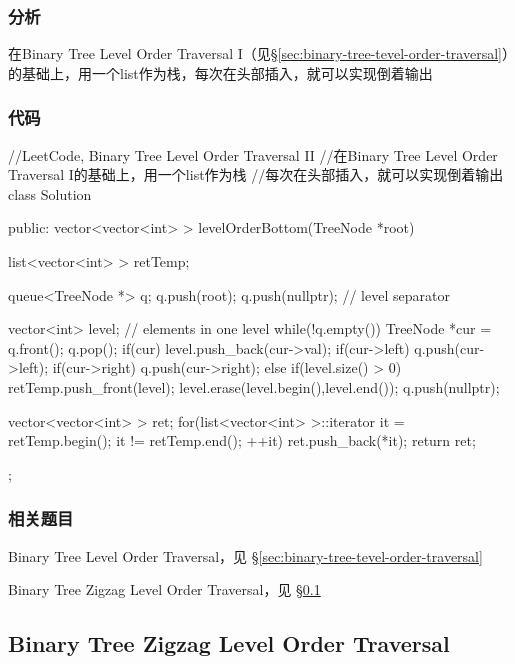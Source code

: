 \subsubsection{分析}
在Binary Tree Level Order Traversal I（见\S \ref{sec:binary-tree-tevel-order-traversal}）的基础上，用一个list作为栈，每次在头部插入，就可以实现倒着输出


\subsubsection{代码}
\begin{Code}
//LeetCode, Binary Tree Level Order Traversal II
//在Binary Tree Level Order Traversal I的基础上，用一个list作为栈
//每次在头部插入，就可以实现倒着输出
class Solution {
public:
    vector<vector<int> > levelOrderBottom(TreeNode *root) {
        list<vector<int> > retTemp;

        queue<TreeNode *> q;
        q.push(root);
        q.push(nullptr); // level separator

        vector<int> level;  // elements in one level
        while(!q.empty()) {
            TreeNode *cur = q.front();
            q.pop();
            if(cur) {
                level.push_back(cur->val);
                if(cur->left) q.push(cur->left);
                if(cur->right) q.push(cur->right);
            } else {
                if(level.size() > 0) {
                    retTemp.push_front(level);
                    level.erase(level.begin(),level.end());
                    q.push(nullptr);
                }
            }
        }

        vector<vector<int> > ret;
        for(list<vector<int> >::iterator it = retTemp.begin();
                it != retTemp.end(); ++it) {
            ret.push_back(*it);
        }
        return ret;
    }
};
\end{Code}


\subsubsection{相关题目}
\begindot
\item Binary Tree Level Order Traversal，见 \S \ref{sec:binary-tree-tevel-order-traversal}
\item Binary Tree Zigzag Level Order Traversal，见 \S \ref{sec:binary-tree-zigzag-level-order-traversal}
\myenddot


\subsection{Binary Tree Zigzag Level Order Traversal}
\label{sec:binary-tree-zigzag-level-order-traversal}


